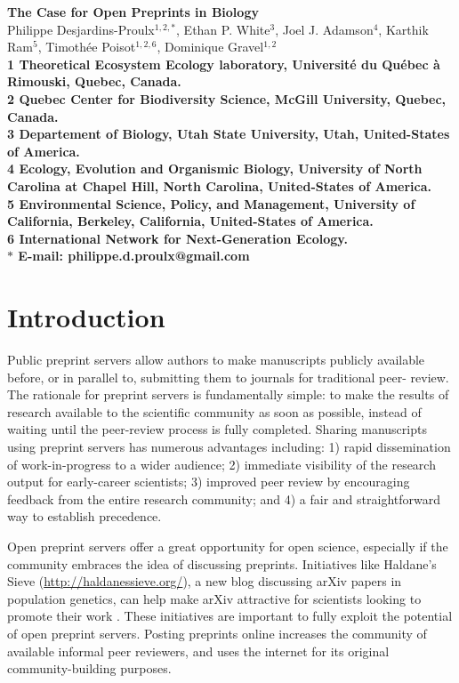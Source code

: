 \documentclass[10pt]{article}
\date{}
\begin{document}
\begin{flushleft}
{\Large
\textbf{The Case for Open Preprints in Biology}
}
\\
Philippe Desjardins-Proulx$^{1, 2,\ast}$, 
Ethan P. White$^{3}$, 
Joel J. Adamson$^{4}$,
Karthik Ram$^{5}$,
Timoth\'ee Poisot$^{1,2,6}$,
Dominique Gravel$^{1,2}$
\\
\bf{1} Theoretical Ecosystem Ecology laboratory, Universit\'e du Qu\'ebec \`a Rimouski, Quebec, Canada.
\\
\bf{2} Quebec Center for Biodiversity Science, McGill University, Quebec, Canada.
\\
\bf{3} Departement of Biology, Utah State University, Utah, United-States of America.
\\
\bf{4} Ecology, Evolution and Organismic Biology, University of North Carolina at Chapel Hill, North Carolina, United-States of America.
\\
\bf{5} Environmental Science, Policy, and Management, University of California, Berkeley, California, United-States of America.
\\
\bf{6} International Network for Next-Generation Ecology.
\\
$\ast$ E-mail: philippe.d.proulx@gmail.com
\end{flushleft}

\section*{Introduction}

Public preprint servers allow authors to make manuscripts publicly available
before, or in parallel to, submitting them to journals for traditional peer-
review. The rationale for preprint servers is fundamentally simple: to make
the results of research available to the scientific community as
soon as possible, instead of waiting until the peer-review process is fully
completed.  Sharing manuscripts using preprint servers has numerous advantages
including: 1) rapid dissemination of work-in-progress to a wider audience; 2)
immediate visibility of the research output for early-career scientists; 3)
improved peer review by encouraging feedback from the entire research
community; and 4) a fair and straightforward way to establish precedence.

Open preprint servers offer a great opportunity for open science, especially if
the community embraces the idea of discussing preprints. Initiatives like
Haldane's Sieve (\href{http://haldanessieve.org/}{http://haldanessieve.org/}), a
new blog discussing arXiv papers in population genetics, can help make arXiv
attractive for scientists looking to promote their work \cite{lom12}. These
initiatives are important to fully exploit the potential of open preprint
servers. Posting preprints online increases the community of available informal
peer reviewers, and uses the internet for its original community-building
purposes.
\end{document}
